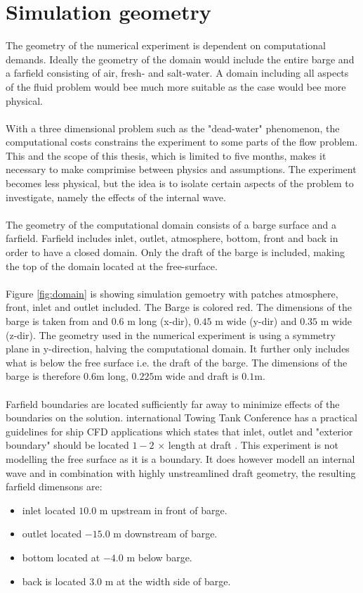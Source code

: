 \documentclass[a4paper, 12pt]{report}
\begin{document}
\section{Simulation geometry}
The geometry of the numerical experiment is dependent on computational demands. Ideally the geometry of the domain would include the entire barge and a farfield consisting of air, fresh- and salt-water. A domain including all aspects of the fluid problem would bee much more suitable as the case would bee more physical.\\
\\
With a three dimensional problem such as the "dead-water" phenomenon, the computational costs constrains the experiment to some parts of the flow problem. This and the scope of this thesis, which is limited to five months, makes it necessary to make comprimise between physics and assumptions. The experiment becomes less physical, but the idea is to isolate certain aspects of the problem to investigate, namely the effects of the internal wave.\\
\\
The geometry of the computational domain consists of a barge surface and a farfield. Farfield includes inlet, outlet, atmosphere, bottom, front and back in order to have a closed domain. Only the draft of the barge is included, making the top of the domain located at the free-surface.\\
\\
Figure \ref{fig:domain} is showing simulation gemoetry with patches atmosphere, front, inlet and outlet included. The Barge is colored red. The dimensions of the barge is taken from \cite{Gou} and $0.6$ m long (x-dir), $0.45$ m wide (y-dir) and $0.35$ m wide (z-dir).  The geometry used in the numerical experiment is using a symmetry plane in y-direction, halving the computational domain. It further only includes what is below the free surface i.e. the draft of the barge. The dimensions of the barge is therefore $0.6$m long, $0.225$m wide and draft is $0.1$m.\\
\\
Farfield boundaries are located sufficiently far away to minimize effects of the boundaries on the solution. international Towing Tank Conference has a practical guidelines for ship CFD applications which states that inlet, outlet and "exterior boundary" should be located $1-2$ $\times$ length at draft \cite{ITTC}. This experiment is not modelling the free surface as it is a boundary. It does however modell an internal wave and in combination with highly unstreamlined draft geometry, the resulting farfield  dimensons are:
\begin{itemize}
\item inlet located $10.0$ m upstream in front of barge.
\item outlet located $-15.0$ m downstream of barge.
\item bottom located at $-4.0$ m below barge.
\item back is located $3.0$ m at the width side of barge.
\end{itemize}
\end{document}

